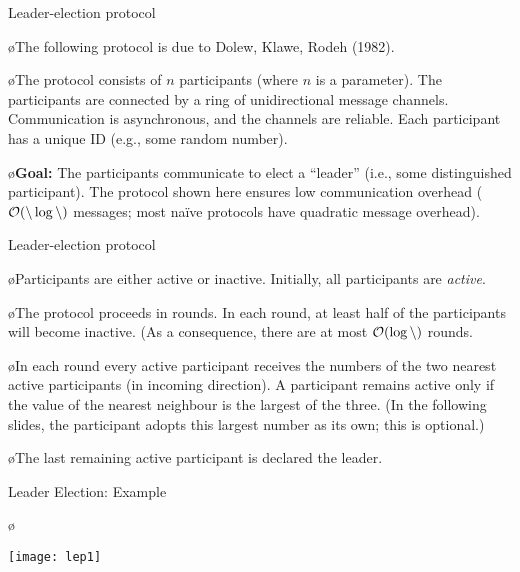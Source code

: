 \documentclass{beamer}
\begin{document}

\begin{frame}{Leader-election protocol}

\o The following protocol is due to Dolew, Klawe, Rodeh (1982).

\o The protocol consists of $n$ participants (where $n$ is a parameter).
   The participants are connected by a ring of unidirectional message channels.
   Communication is asynchronous, and the channels are reliable. Each
   participant has a unique ID (e.g., some random number).

\o \textbf{Goal:} The participants communicate to elect a ``leader''
   (i.e., some distinguished participant). The protocol shown here
   ensures low communication overhead ($\cal O(n\log n)$ messages;
   most naïve protocols have quadratic message overhead).

\end{frame}


\begin{frame}{Leader-election protocol}

\o Participants are either active or inactive.
   Initially, all participants are \emph{active}.

\o The protocol proceeds in rounds. In each round, at least
   half of the participants will become inactive. (As a consequence,
   there are at most $\cal O(\log n)$ rounds.

\o In each round every active participant receives the numbers
   of the two nearest active participants (in incoming direction).
   A participant remains active only if the value of the nearest
   neighbour is the largest of the three. (In the following slides, the
   participant adopts this largest number as its own; this is optional.)

\o The last remaining active participant is declared the leader.

\end{frame}


\begin{frame}{Leader Election: Example}

\o \centerline{\texttt{[image: lep1]}}

\end{frame}
\end{document}
